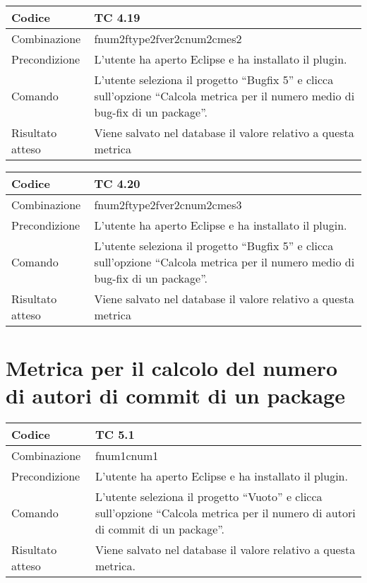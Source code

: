 \begin{table}[ht]
\begin{tabular}{|p{3cm}|p{9cm}|}
\hline
\cellcolor{lightgray}Codice				& TC 4.19								\\
\hline
\cellcolor{lightgray}Combinazione		& fnum2ftype2fver2cnum2cmes2 									\\
\hline
\cellcolor{lightgray}Precondizione		& L'utente ha aperto Eclipse e ha installato il plugin.								\\
\hline
\cellcolor{lightgray}Comando			& L'utente seleziona il progetto ``Bugfix 5''  e clicca sull'opzione ``Calcola metrica per il numero medio di bug-fix di un package''.	\\
\hline
\cellcolor{lightgray}Risultato atteso	& Viene salvato nel database il valore relativo a questa metrica	\\
\hline
\end{tabular}
\end{table}

\begin{table}[ht]
\begin{tabular}{|p{3cm}|p{9cm}|}
\hline
\cellcolor{lightgray}Codice				& TC 4.20								\\
\hline
\cellcolor{lightgray}Combinazione		& fnum2ftype2fver2cnum2cmes3 									\\
\hline
\cellcolor{lightgray}Precondizione		& L'utente ha aperto Eclipse e ha installato il plugin.									\\
\hline
\cellcolor{lightgray}Comando			& L'utente seleziona il progetto ``Bugfix 5''  e clicca sull'opzione ``Calcola metrica per il numero medio di bug-fix di un package''.	\\
\hline
\cellcolor{lightgray}Risultato atteso	& Viene salvato nel database il valore relativo a questa metrica	\\
\hline
\end{tabular}
\end{table}
\clearpage

\section{Metrica per il calcolo del numero di autori di commit di un package}

\begin{table}[ht]
\begin{tabular}{|p{3cm}|p{9cm}|}
\hline
\cellcolor{lightgray}Codice				& TC 5.1								\\
\hline
\cellcolor{lightgray}Combinazione		& fnum1cnum1									\\
\hline
\cellcolor{lightgray}Precondizione		& L'utente ha aperto Eclipse e ha installato il plugin.		\\
\hline
\cellcolor{lightgray}Comando			& L'utente seleziona il progetto ``Vuoto''  e clicca sull'opzione ``Calcola metrica per il numero di autori di commit di un package''.	\\
\hline
\cellcolor{lightgray}Risultato atteso	& Viene salvato nel database il valore relativo a questa metrica.\\
\hline
\end{tabular}
\end{table}

